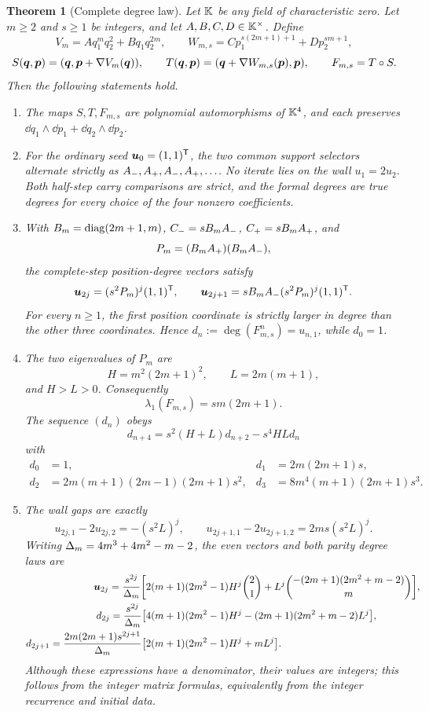 \documentclass[11pt]{article}
\newtheorem{theorem}{Theorem}[section]
\theoremstyle{definition}
\theoremstyle{remark}
\begin{document}
\begin{theorem}[Complete degree law]
\label{thm:main}
Let \(\mathbb{K}\) be any field of characteristic zero.  Let \(m\geq2\) and
\(s\geq1\) be integers, and let \(A,B,C,D\in\mathbb{K}^\times\).  Define
\[
V_m=Aq_1^m q_2^2+Bq_1q_2^{2m},\qquad
W_{m,s}=Cp_1^{s(2m+1)+1}+Dp_2^{sm+1},
\]
\[
S(\boldsymbol{q},\boldsymbol{p})=(\boldsymbol{q},\boldsymbol{p}+\nabla V_m(\boldsymbol{q})),\qquad
T(\boldsymbol{q},\boldsymbol{p})=(\boldsymbol{q}+\nabla W_{m,s}(\boldsymbol{p}),\boldsymbol{p}),
\qquad F_{m,s}=T\circ S.
\]
Then the following statements hold.
\begin{enumerate}[label=\textup{(\roman*)}]
\item The maps \(S,T,F_{m,s}\) are polynomial automorphisms of
\(\mathbb{K}^4\), and each preserves \(\dd q_1\wedge\dd p_1+
\dd q_2\wedge\dd p_2\).
\item For the ordinary seed \(\boldsymbol{u}_0=(1,1)^{\mathsf{T}}\), the two common
support selectors alternate strictly as
\(A_{-},A_{+},A_{-},A_{+},\ldots\).  No iterate lies on the wall
\(u_1=2u_2\).  Both half-step carry comparisons are strict, and the
formal degrees are true degrees for every choice of the four nonzero
coefficients.
\item With \(B_m=\operatorname{diag}(2m+1,m)\),
\(C_{-}=sB_mA_{-}\), \(C_{+}=sB_mA_{+}\), and
\[
P_m=(B_mA_{+})(B_mA_{-}),
\]
the complete-step position-degree vectors satisfy
\[
\boldsymbol{u}_{2j}=(s^2P_m)^j(1,1)^{\mathsf{T}},\qquad
\boldsymbol{u}_{2j+1}=sB_mA_{-}(s^2P_m)^j(1,1)^{\mathsf{T}}.
\]
For every \(n\geq1\), the first position coordinate is strictly larger
in degree than the other three coordinates.  Hence
\(d_n:=\deg(F_{m,s}^n)=u_{n,1}\), while \(d_0=1\).
\item The two eigenvalues of \(P_m\) are
\[
H=m^2(2m+1)^2,\qquad L=2m(m+1),
\]
and \(H>L>0\).  Consequently
\[
\lambda_1(F_{m,s})=sm(2m+1).
\]
The sequence \((d_n)\) obeys
\[
d_{n+4}=s^2(H+L)d_{n+2}-s^4HLd_n
\]
with
\begin{align*}
d_0&=1,&d_1&=2m(2m+1)s,\\
d_2&=2m(m+1)(2m-1)(2m+1)s^2,&
d_3&=8m^4(m+1)(2m+1)s^3.
\end{align*}
\item The wall gaps are exactly
\[
u_{2j,1}-2u_{2j,2}=-(s^2L)^j,\qquad
u_{2j+1,1}-2u_{2j+1,2}=2ms(s^2L)^j.
\]
Writing \(\Delta_m=4m^3+4m^2-m-2\), the even vectors and both parity
degree laws are
\begin{align*}
\boldsymbol{u}_{2j}=\frac{s^{2j}}{\Delta_m}\bigg[&
2(m+1)(2m^2-1)H^j\binom{2}{1}
+L^j\binom{-(2m+1)(2m^2+m-2)}{m}\bigg],\\
d_{2j}=\frac{s^{2j}}{\Delta_m}\big[&
4(m+1)(2m^2-1)H^j
-(2m+1)(2m^2+m-2)L^j\big],\\
d_{2j+1}=\frac{2m(2m+1)s^{2j+1}}{\Delta_m}\big[&
2(m+1)(2m^2-1)H^j+mL^j\big].
\end{align*}
Although these expressions have a denominator, their values are integers;
this follows from the integer matrix formulas, equivalently from the
integer recurrence and initial data.
\end{enumerate}
\end{theorem}
\end{document}
